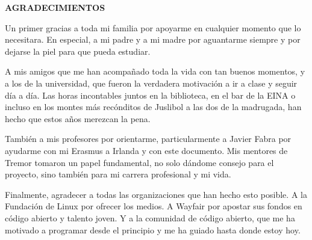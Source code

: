 
\begin{center}
{\LARGE \bfseries AGRADECIMIENTOS}
\vspace{2.5cm}
\end{center}

Un primer gracias a toda mi familia por apoyarme en cualquier momento que lo
necesitara. En especial, a mi padre y a mi madre por aguantarme siempre y por
dejarse la piel para que pueda estudiar.

A mis amigos que me han acompañado toda la vida con tan buenos momentos, y a los
de la universidad, que fueron la verdadera motivación a ir a clase y seguir día
a día. Las horas incontables juntos en la biblioteca, en el bar de la EINA o
incluso en los montes más recónditos de Juslibol a las dos de la madrugada, han
hecho que estos años merezcan la pena.

También a mis profesores por orientarme, particularmente a Javier Fabra por
ayudarme con mi Erasmus a Irlanda y con este documento. Mis mentores de Tremor
tomaron un papel fundamental, no solo dándome consejo para el proyecto, sino
también para mi carrera profesional y mi vida.

Finalmente, agradecer a todas las organizaciones que han hecho esto posible. A
la Fundación de Linux por ofrecer los medios. A Wayfair por apostar sus fondos
en código abierto y talento joven. Y a la comunidad de código abierto, que me ha
motivado a programar desde el principio y me ha guiado hasta donde estoy hoy.
